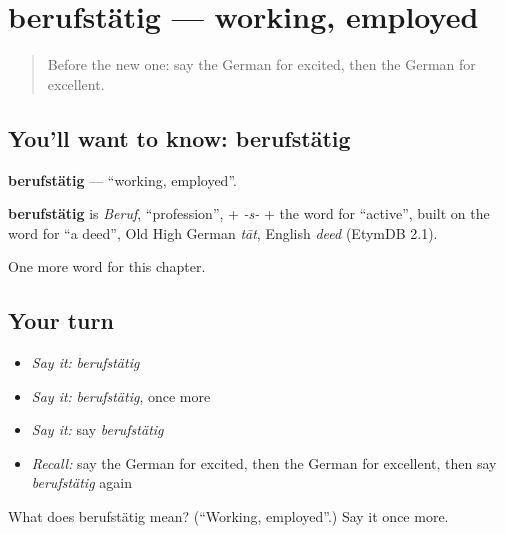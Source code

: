 \section[berufstätig]{berufstätig — working, employed}

\label{lesson:GE-C211-berufstaetig}



\begin{quote}
Before the new one: say the German for excited, then the German for excellent.
\end{quote}

\subsection*{You'll want to know: berufstätig}
\textbf{berufstätig} — \textquotedblleft{}working, employed\textquotedblright{}.

\begin{cousinweb}
\textbf{berufstätig} is \emph{Beruf}, \textquotedblleft{}profession\textquotedblright{}, + \emph{-s-} + the word for \textquotedblleft{}active\textquotedblright{}, built on the word for \textquotedblleft{}a deed\textquotedblright{}, Old High German \emph{tāt}, English \emph{deed} (EtymDB 2.1).
\end{cousinweb}

\begin{grammarlens}[title={What you've built}]
One more word for this chapter.
\end{grammarlens}

\subsection*{Your turn}
\begin{itemize}
\raggedright
  \item \emph{Say it:} \emph{berufstätig}
  \item \emph{Say it:} \emph{berufstätig}, once more
  \item \emph{Say it:} say \emph{berufstätig}
  \item \emph{Recall:} say the German for excited, then the German for excellent, then say \emph{berufstätig} again
\end{itemize}

\begin{tcolorbox}[breakable,colback=teal!4,colframe=teal!35!black,title={Before you move on}]
What does berufstätig mean? (\textquotedblleft{}Working, employed\textquotedblright{}.) Say it once more.
\end{tcolorbox}
